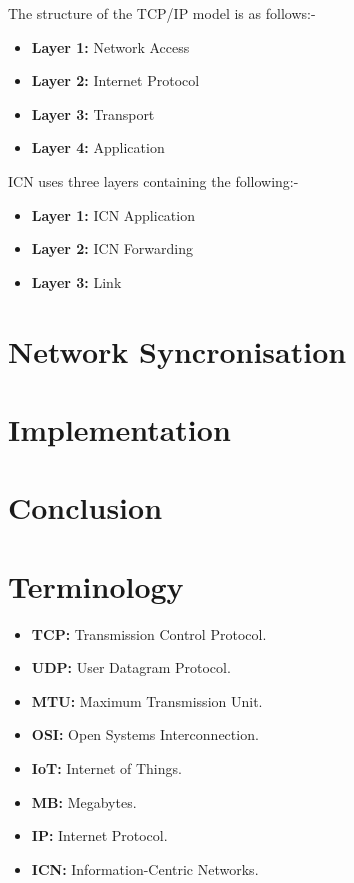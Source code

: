 \documentclass[conference]{IEEEtran}
\begin{document}
      The structure of the TCP/IP model is as follows:-
      \begin{itemize}
        \centering
        \item[] \textbf{Layer 1:} Network Access
        \item[] \textbf{Layer 2:} Internet Protocol
        \item[] \textbf{Layer 3:} Transport
        \item[] \textbf{Layer 4:} Application
      \end{itemize}
    
      ICN uses three layers containing the following:-
      \begin{itemize}
        \centering
        \item[] \textbf{Layer 1:} ICN Application
        \item[] \textbf{Layer 2:} ICN Forwarding
        \item[] \textbf{Layer 3:} Link
      \end{itemize}

    \section{Network Syncronisation}

    \section{Implementation}

    \section{Conclusion}
    
    \section{Terminology}
      \begin{itemize}
        \item \textbf{TCP:} Transmission Control Protocol.
        \item \textbf{UDP:} User Datagram Protocol.
        \item \textbf{MTU:} Maximum Transmission Unit.
        \item \textbf{OSI:} Open Systems Interconnection.
        \item \textbf{IoT:} Internet of Things.
        \item \textbf{MB:} Megabytes.
        \item \textbf{IP:} Internet Protocol.
        \item \textbf{ICN:} Information-Centric Networks.
      \end{itemize}

	\renewcommand\refname{\section{Reference List}}
	\small{
    }
\end{document}
